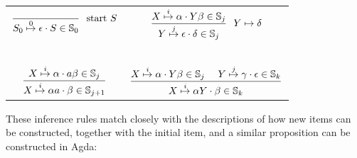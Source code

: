 		\begin{table}[h]
			\centering
			\begin{tabular}{cc}
				\( \displaystyle \frac{}
					{\earley{S_0}{\epsilon}{S}{0} \in \St{0}}
					~~\textrm{start } S
					\) &
				\( \displaystyle \frac
					{\earley{X}{\alpha}{Y\beta}{i} \in \St{j}}
					{\earley{Y}{\epsilon}{\delta}{j} \in \St{j}}
					~~Y \mapsto \delta
					\)
				\\~&~\\
				\( \displaystyle \frac
					{\earley{X}{\alpha}{a\beta}{i} \in \St{j}}
					{\earley{X}{\alpha a}{\beta}{i} \in \St{j+1}}
					\) &
				\( \displaystyle \frac
					{
						\earley{X}{\alpha}{Y\beta}{i} \in \St{j}~~~~
						\earley{Y}{\gamma}{\epsilon}{j} \in \St{k}
						}
					{\earley{X}{\alpha Y}{\beta}{i} \in \St{k}}
					\)
			\end{tabular}
		\end{table}

		These inference rules match closely with the descriptions of how new
		items can be constructed, together with the initial item, and a similar
		proposition can be constructed in Agda:

